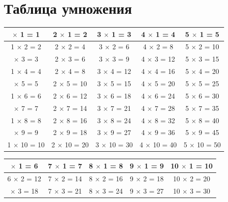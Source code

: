 \documentclass[a5paper, 8pt]{extarticle}
\begin{document}
\section{Таблица умножения}
{\scriptsize
\begin{center}
{
\setlength{\extrarowheight}{2pt}
\begin{tabular}{|c|c|c|c|c|}
\hline 
\rowcolor{Gray}
\hline 
1 $\times$ 1 = 1 & 2 $\times$ 1 = 2 & 3 $\times$ 1 = 3 &4 $\times$ 1 = 4 &5 $\times$ 1 = 5\\ 
\hline 
1 $\times$ 2 = 2 & 2 $\times$ 2 = 4 & 3 $\times$ 2 = 6 &4 $\times$ 2 = 8 &5 $\times$ 2 = 10\\ 
\rowcolor{Gray}
\hline 
1 $\times$ 3 = 3 & 2 $\times$ 3 = 6 & 3 $\times$ 3 = 9 &4 $\times$ 3 = 12 &5 $\times$ 3 = 15\\ 
\hline 
1 $\times$ 4 = 4 & 2 $\times$ 4 = 8 &3 $\times$ 4 = 12 &4 $\times$ 4 = 16 &5 $\times$ 4 = 20\\ 
\rowcolor{Gray}
\hline 
1 $\times$ 5 = 5 & 2 $\times$ 5 = 10 & 3 $\times$ 5 = 15 &4 $\times$ 5 = 20 &5 $\times$ 5 = 25\\
\hline 
1 $\times$ 6 = 6 & 2 $\times$ 6 = 12 &3 $\times$ 6 = 18 &4 $\times$ 6 = 24 &5 $\times$ 6 = 30\\ 
\rowcolor{Gray}
\hline 
1 $\times$ 7 = 7 & 2 $\times$ 7 = 14 &3 $\times$ 7 = 21 &4 $\times$ 7 = 28 &5 $\times$ 7 = 35\\
\hline 
1 $\times$ 8 = 8 & 2 $\times$ 8 = 16 &3 $\times$ 8 = 24 &4 $\times$ 8 = 32 &5 $\times$ 8 = 40\\ 
\rowcolor{Gray}
\hline 
1 $\times$ 9 = 9 &2 $\times$ 9 = 18 &3 $\times$ 9 = 27 &4 $\times$ 9 = 36 &5 $\times$ 9 = 45\\
\hline 
1 $\times$ 10 = 10 &2 $\times$ 10 = 20 &3 $\times$ 10 = 30 &4 $\times$ 10 = 40 &5 $\times$ 10 = 50\\ 
\hline 
\end{tabular} 
}
\end{center}
\begin{center}
{
\setlength{\extrarowheight}{2pt}
\begin{tabular}{|c|c|c|c|c|}
\hline 
\rowcolor{Gray}
\hline 
6 $\times$ 1 = 6 & 7 $\times$ 1 = 7 & 8 $\times$ 1 = 8 &9 $\times$ 1 = 9 &10 $\times$ 1 = 10\\ 
\hline 
6 $\times$ 2 = 12 & 7 $\times$ 2 = 14 & 8 $\times$ 2 = 16 &9 $\times$ 2 = 18 &10 $\times$ 2 = 20\\ 
\rowcolor{Gray}
\hline 
6 $\times$ 3 = 18 & 7 $\times$ 3 = 21 & 8 $\times$ 3 = 24 &9 $\times$ 3 = 27 &10 $\times$ 3 = 30\\ 

\end{tabular}}
\end{center}}
\end{document}

